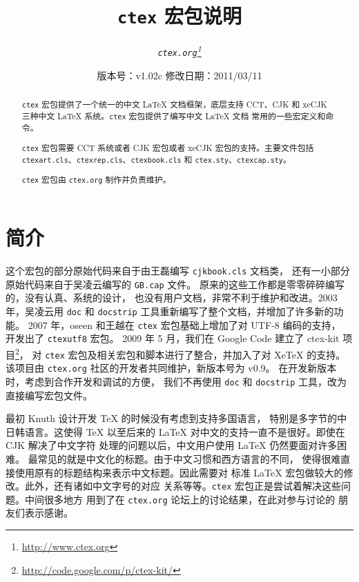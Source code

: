 \documentclass{ltxdoc}
\newcommand{\ctex}{\texttt{ctex}}
\newcommand{\ctexorg}{\texttt{ctex.org}}
\begin{document}
\title{\bf \ctex{} 宏包说明}
\author{\it \ctexorg\thanks{\url{http://www.ctex.org}}}
\date{\small 版本号：v1.02c \ccwd 修改日期：2011/03/11}
\maketitle


\begin{abstract}
\ctex{} 宏包提供了一个统一的中文 \LaTeX{} 文档框架，底层支持 CCT、CJK 和
 xeCJK 三种中文 \LaTeX{} 系统。\ctex{} 宏包提供了编写中文 \LaTeX{} 文档
常用的一些宏定义和命令。

\ctex{} 宏包需要 CCT 系统或者 CJK 宏包或者 xeCJK 宏包的支持。主要文件包括
 \texttt{ctexart.cls}、\texttt{ctexrep.cls}、\texttt{ctexbook.cls} 和
 \texttt{ctex.sty}、\texttt{ctexcap.sty}。

\ctex{} 宏包由 \ctexorg{} 制作并负责维护。
\end{abstract}

\tableofcontents

\section{简介}

这个宏包的部分原始代码来自于由王磊编写 \texttt{cjkbook.cls} 文档类，
还有一小部分原始代码来自于吴凌云编写的 \texttt{GB.cap} 文件。
原来的这些工作都是零零碎碎编写的，没有认真、系统的设计，
也没有用户文档，非常不利于维护和改进。2003 年，吴凌云用 \texttt{doc}
和 \texttt{docstrip} 工具重新编写了整个文档，并增加了许多新的功能。
2007 年，oseen 和王越在 \ctex{} 宏包基础上增加了对 UTF-8 编码的支持，
开发出了 \texttt{ctexutf8} 宏包。
2009 年 5 月，我们在 Google Code 建立了 ctex-kit 项目\footnote{\url{http://code.google.com/p/ctex-kit/}}，
对 \ctex{} 宏包及相关宏包和脚本进行了整合，并加入了对 Xe\TeX{} 的支持。
该项目由 \ctexorg{} 社区的开发者共同维护，新版本号为 v0.9。
在开发新版本时，考虑到合作开发和调试的方便，
我们不再使用 \texttt{doc} 和 \texttt{docstrip} 工具，改为直接编写宏包文件。

最初 Knuth 设计开发 \TeX{} 的时候没有考虑到支持多国语言，
特别是多字节的中日韩语言。这使得 \TeX{} 以至后来的
\LaTeX{} 对中文的支持一直不是很好。即使在 CJK 解决了中文字符
处理的问题以后，中文用户使用 \LaTeX{} 仍然要面对许多困难。
最常见的就是中文化的标题。由于中文习惯和西方语言的不同，
使得很难直接使用原有的标题结构来表示中文标题。因此需要对
标准 \LaTeX{} 宏包做较大的修改。此外，还有诸如中文字号的对应
关系等等。\ctex{} 宏包正是尝试着解决这些问题。中间很多地方
用到了在 \ctexorg{} 论坛上的讨论结果，在此对参与讨论的
朋友们表示感谢。
\end{document}
